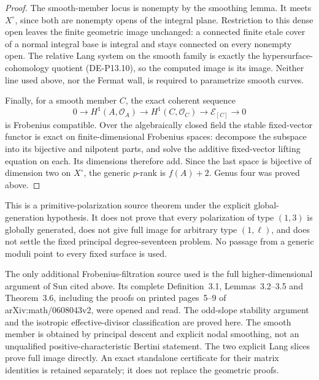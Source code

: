 \begin{proof}
The smooth-member locus is nonempty by the smoothing lemma.
It meets \(X^\circ\), since both are nonempty opens of the
integral plane. Restriction to this dense open leaves the finite
geometric image unchanged: a connected finite etale cover of a
normal integral base is integral and stays connected on every
nonempty open. The relative Lang system on the smooth family
is exactly the hypersurface-cohomology quotient (DE-P13.10),
so the computed image is its image. Neither line used above,
nor the Fermat wall, is required to parametrize smooth curves.

Finally, for a smooth member \(C\), the exact coherent sequence
\[
 0\longrightarrow H^1(A,\mathcal O_A)
  \longrightarrow H^1(C,\mathcal O_C)
  \longrightarrow\mathcal E_{[C]}\longrightarrow0
\]
is Frobenius compatible. Over the algebraically closed field the
stable fixed-vector functor is exact on finite-dimensional
Frobenius spaces: decompose the subspace into its bijective and
nilpotent parts, and solve the additive fixed-vector lifting
equation on each. Its dimensions therefore add. Since the last
space is bijective of dimension two on \(X^\circ\), the
generic \(p\)-rank is \(f(A)+2\). Genus four was proved above.
\end{proof}

\begin{remark}
\label{rem:DE-primitive-one-three-scope}
This is a primitive-polarization source theorem under the explicit
global-generation hypothesis. It does not prove that every
polarization of type \((1,3)\) is globally generated, does not
give full image for arbitrary type \((1,\ell)\), and does not
settle the fixed principal degree-seventeen problem. No passage
from a generic moduli point to every fixed surface is used.

The only additional Frobenius-filtration source used is the full
higher-dimensional argument of Sun cited above. Its complete
Definition~3.1, Lemmas~3.2--3.5 and Theorem~3.6, including the
proofs on printed pages~5--9 of arXiv:math/0608043v2, were opened
and read. The odd-slope stability argument and the isotropic
effective-divisor classification are proved here. The smooth
member is obtained by principal descent and explicit nodal
smoothing, not an unqualified positive-characteristic Bertini
statement. The two explicit Lang slices prove full image directly.
An exact standalone certificate for their matrix identities is
retained separately; it does not replace the geometric proofs.
\end{remark}
